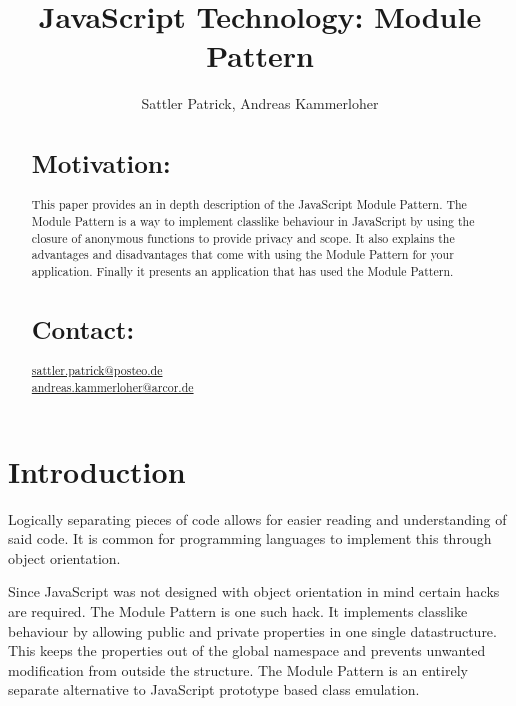 \documentclass{bioinfo}
\begin{document}

\title[Module Pattern]{JavaScript Technology: Module Pattern}
\author[Sattler, Kammerloher]{Sattler Patrick, Andreas Kammerloher}
\address{Bioinformatics and Computational Biology Departement \\
Rostlab}



\maketitle

\begin{abstract}

\section{Motivation:}
This paper provides an in depth description of the JavaScript Module Pattern. The Module Pattern is a way to implement classlike behaviour in JavaScript by using the closure of anonymous functions to provide privacy and scope. It also explains the advantages and disadvantages that come with using the Module Pattern for your application. Finally it presents an application that has used the Module Pattern.

\section{Contact:} \href{sattler.patrick@posteo.de}{sattler.patrick@posteo.de} \\
\href{andreas.kammerloher@arcor.de}{andreas.kammerloher@arcor.de}
\end{abstract}

\section{Introduction}
Logically separating pieces of code allows for easier reading and understanding of said code. It is common for programming languages to implement this through object orientation.

Since JavaScript was not designed with object orientation in mind certain hacks are required. The Module Pattern is one such hack. It implements classlike behaviour by allowing public and private properties in one single datastructure. This keeps the properties out of the global namespace and prevents unwanted modification from outside the structure. The Module Pattern is an entirely separate alternative to JavaScript prototype based class emulation.
\end{document}
